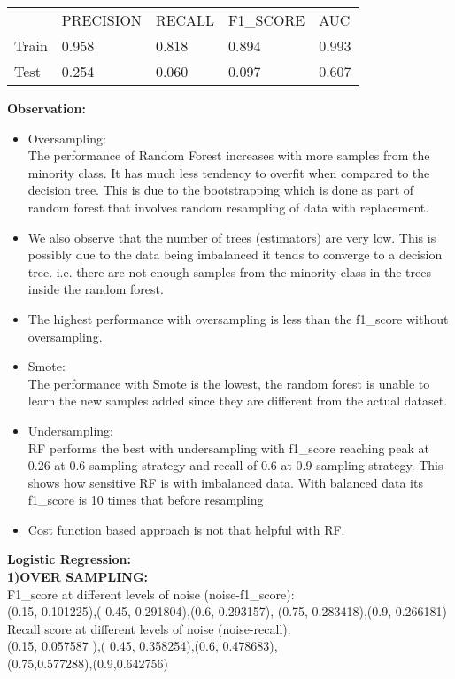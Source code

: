 \documentclass[fleqn,10pt]{SelfArx} %
\begin{document}
\begin{itemize}
		\begin{tabular}{lllll}
			& PRECISION & RECALL & F1\_SCORE & AUC \\
			Train & 0.958     & 0.818 & 0.894     & 0.993          \\
			Test  & 0.254     & 0.060  & 0.097     & 0.607         
		\end{tabular}	
	\bigbreak
	\noindent
	\textbf{Observation:}\\
	\begin{itemize}
		\item Oversampling:\\
		The performance of Random Forest increases with more samples from the minority class. It has much less tendency to overfit when compared to the decision tree. This is due to the bootstrapping which is done as part of random forest that involves random resampling of data with replacement.\\
		\item We also observe that the number of trees (estimators) are very low. This is possibly due to the data being imbalanced it tends to converge to a decision tree. i.e. there are not enough samples from the minority class in the trees inside the random forest.\\
		\item The highest performance with oversampling is less than the f1_score without oversampling.\\
		\item Smote:\\
		The performance with Smote is the lowest, the random forest is unable to learn the new samples added since they are different from the actual dataset.\\
		\item Undersampling:\\
		RF performs the best with undersampling with f1_score reaching peak at 0.26 at 0.6 sampling strategy and recall of 0.6 at 0.9 sampling strategy. This shows how sensitive RF is with imbalanced data.  With balanced data its f1_score is 10 times that before resampling\\
		\item 	Cost function based approach is not that helpful with RF.
		
	\end{itemize}
\textbf{	Logistic Regression:}\\

\noindent
\textbf{1)OVER SAMPLING:}\\
\noindent
F1_score at different levels of noise (noise-f1_score):\\
(0.15, 0.101225),( 0.45, 0.291804),(0.6, 0.293157),
(0.75, 0.283418),(0.9, 0.266181)   \\                         
Recall score at different levels of noise (noise-recall):\\
(0.15, 0.057587 ),( 0.45, 0.358254),(0.6, 0.478683),\\
(0.75,0.577288),(0.9,0.642756)\\


\end{itemize}
\end{document}
